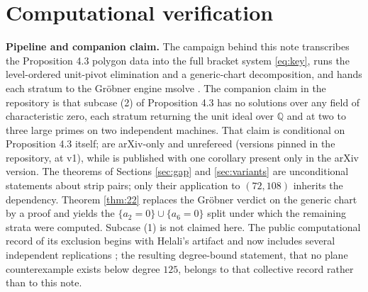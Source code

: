 \documentclass[11pt]{article}
\theoremstyle{definition}
\theoremstyle{remark}
\begin{document}
\section{Computational verification}\label{sec:computation}

\noindent\textbf{Pipeline and companion claim.} The campaign behind this note transcribes the Proposition 4.3 polygon data into the full bracket system \eqref{eq:key}, runs the level-ordered unit-pivot elimination and a generic-chart decomposition, and hands each stratum to the Gr\"obner engine msolve \cite{msolve}. The companion claim in the repository is that subcase (2) of Proposition 4.3 has no solutions over any field of characteristic zero, each stratum returning the unit ideal over $\mathbb{Q}$ and at two to three large primes on two independent machines. That claim is conditional on Proposition 4.3 itself; \cite{GGV2,GGV3,GGV4,GGHV} are arXiv-only and unrefereed (versions pinned in the repository, \cite{GGHV} at v1), while \cite{GGV1} is published with one corollary present only in the arXiv version. The theorems of Sections \ref{sec:gap} and \ref{sec:variants} are unconditional statements about strip pairs; only their application to $(72,108)$ inherits the dependency. Theorem \ref{thm:22} replaces the Gr\"obner verdict on the generic chart by a proof and yields the $\{a_2=0\}\cup\{a_6=0\}$ split under which the remaining strata were computed. Subcase (1) is not claimed here. The public computational record of its exclusion begins with Helali's artifact \cite{Helali} and now includes several independent replications \cite{Suzuki,Strinz,Ishihara}; the resulting degree-bound statement, that no plane counterexample exists below degree $125$, belongs to that collective record rather than to this note.
\end{document}
